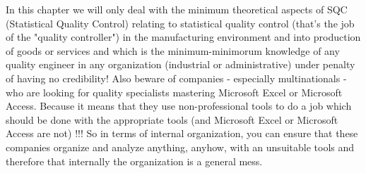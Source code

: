 In this chapter we will only deal with the minimum theoretical aspects of SQC (Statistical Quality Control) relating to statistical quality control (that's the job of the "quality controller") in the manufacturing environment and into production of goods or services and which is the minimum-minimorum knowledge of any quality engineer in any organization (industrial or administrative) under penalty of having no credibility! Also beware of companies - especially multinationals - who are looking for quality specialists mastering Microsoft Excel or Microsoft Access. Because it means that they use non-professional tools to do a job which should be done with the appropriate tools (and Microsoft Excel or Microsoft Access are not) !!! So in terms of internal organization, you can ensure that these companies organize and analyze anything, anyhow, with an unsuitable tools and therefore that internally the organization is a general mess.


